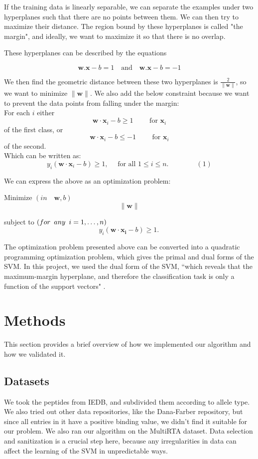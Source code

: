 \documentclass[journal]{IEEEtran}
\begin{document}
If the training data is linearly separable, we can separate the examples under two hyperplanes such that there are no points between them. We can then try to maximize their distance. The region bound by these hyperplanes is called "the margin", and ideally, we want to maximize it so that there is no overlap.

These hyperplanes can be described by the equations


$$
    \mathbf{w}.\mathbf{x} - b = 1    \quad \textrm{and} \quad 
    \mathbf{w}.\mathbf{x} - b = -1
$$

We then find the geometric distance between these two hyperplanes is $\tfrac{2}{\|\mathbf{w}\|}$, so we want to minimize $\|\mathbf{w}\|$. We also add the below constraint because we want to prevent the data points from falling under the margin:\\ 

For each $i$ either
$$\mathbf{w}\cdot\mathbf{x}_i - b \ge 1\qquad\text{ for }\mathbf{x}_i$$ 
of the first class, or
$$\mathbf{w}\cdot\mathbf{x}_i - b \le -1\qquad\text{ for }\mathbf{x}_i$$ 
of the second.  \\  

Which can be written as:
$$
    y_i(\mathbf{w}\cdot\mathbf{x}_i - b) \ge 1, \quad \text{ for all } 1 \le i \le n.\qquad\qquad(1)
$$

We can express the above as an optimization problem:

Minimize $(in \quad {\mathbf{w},b})$
$$   
 \|\mathbf{w}\|
$$
 
subject to $(for \enskip any \enskip i = 1, \dots, n)$
$$
y_i(\mathbf{w}\cdot\mathbf{x_i} - b) \ge 1. \,
$$

The optimization problem presented above can be converted into a quadratic programming optimization problem, which gives the primal and dual forms of the SVM. In this project, we used the dual form of the SVM, ``which reveals that the maximum-margin hyperplane, and therefore the classification task is only a function of the support vectors" \cite{WikipediaSVM}.


\section{Methods}
This section provides a brief overview of how we implemented our algorithm and how we validated it.

\subsection{Datasets}
We took the peptides from IEDB, and subdivided them according to allele type. We also tried out other data repositories, like the Dana-Farber \cite{DanaFarber} repository, but since all entries in it have a positive binding value, we didn't find it suitable for our problem. We also ran our algorithm on the MultiRTA \cite{MultiRTA} dataset. Data selection and sanitization is a crucial step here, because any irregularities in data can affect the learning of the SVM in unpredictable ways.
\end{document}
